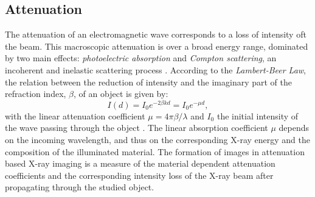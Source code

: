 \subsection{Attenuation}\label{subsec:att}
The attenuation of an electromagnetic wave corresponds to a loss of intensity oft the beam. This macroscopic attenuation is over a broad energy range, dominated by two main effects: \textit{photoelectric absorption} and \textit{Compton scattering}, an incoherent and inelastic scattering process \citep{Als-nielsen}. According to the \textit{Lambert-Beer Law}, the relation between the reduction of intensity and the imaginary part of the refraction index, $\beta$, of an object is given by:
\begin{equation}
I(d) = I_{0}e^{-2\beta kd} = I_{0}e^{-\mu d} ,   
\end{equation}     
with the linear attenuation coefficient $ \mu = 4\pi \beta / \lambda$ and $I_{0}$ the initial intensity of the wave passing through the object \citep{Cremer2013}. The linear absorption coefficient $\mu$ depends on the incoming wavelength, and thus on the corresponding X-ray energy and the composition of the illuminated material. The formation of images in attenuation based X-ray imaging is a measure of the material dependent attenuation coefficients and the corresponding intensity loss of the X-ray beam after propagating through the studied object.         
